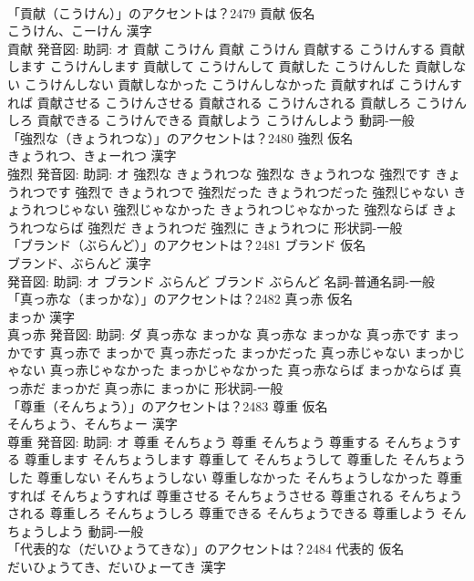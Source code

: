 \documentclass[8pt]{extreport}
\begin{document}
\begin{CJK}{UTF8}{min}
\\	「貢献（こうけん）」のアクセントは？2479	貢献 仮名　
\\	こうけん、こーけん 漢字　
\\	貢献 発音図: 助詞: オ	貢献 こうけん		貢献 こうけん 貢献する こうけんする 貢献します こうけんします 貢献して こうけんして 貢献した こうけんした 貢献しない こうけんしない 貢献しなかった こうけんしなかった 貢献すれば こうけんすれば 貢献させる こうけんさせる 貢献される こうけんされる 貢献しろ こうけんしろ 貢献できる こうけんできる 貢献しよう こうけんしよう				動詞-一般 
\\	「強烈な（きょうれつな）」のアクセントは？2480	強烈 仮名　
\\	きょうれつ、きょーれつ 漢字　
\\	強烈 発音図: 助詞: オ	強烈な きょうれつな		強烈な きょうれつな 強烈です きょうれつです 強烈で きょうれつで 強烈だった きょうれつだった 強烈じゃない きょうれつじゃない 強烈じゃなかった きょうれつじゃなかった 強烈ならば きょうれつならば 強烈だ きょうれつだ 強烈に きょうれつに				形状詞-一般 
\\	「ブランド（ぶらんど）」のアクセントは？2481	ブランド 仮名　
\\	ブランド、ぶらんど 漢字　
\\	発音図: 助詞: オ	ブランド ぶらんど		ブランド ぶらんど				名詞-普通名詞-一般 
\\	「真っ赤な（まっかな）」のアクセントは？2482	真っ赤 仮名　
\\	まっか 漢字　
\\	真っ赤 発音図: 助詞: ダ	真っ赤な まっかな		真っ赤な まっかな 真っ赤です まっかです 真っ赤で まっかで 真っ赤だった まっかだった 真っ赤じゃない まっかじゃない 真っ赤じゃなかった まっかじゃなかった 真っ赤ならば まっかならば 真っ赤だ まっかだ 真っ赤に まっかに				形状詞-一般 
\\	「尊重（そんちょう）」のアクセントは？2483	尊重 仮名　
\\	そんちょう、そんちょー 漢字　
\\	尊重 発音図: 助詞: オ	尊重 そんちょう		尊重 そんちょう 尊重する そんちょうする 尊重します そんちょうします 尊重して そんちょうして 尊重した そんちょうした 尊重しない そんちょうしない 尊重しなかった そんちょうしなかった 尊重すれば そんちょうすれば 尊重させる そんちょうさせる 尊重される そんちょうされる 尊重しろ そんちょうしろ 尊重できる そんちょうできる 尊重しよう そんちょうしよう				動詞-一般 
\\	「代表的な（だいひょうてきな）」のアクセントは？2484	代表的 仮名　
\\	だいひょうてき、だいひょーてき 漢字　

\end{CJK}
\end{document}
